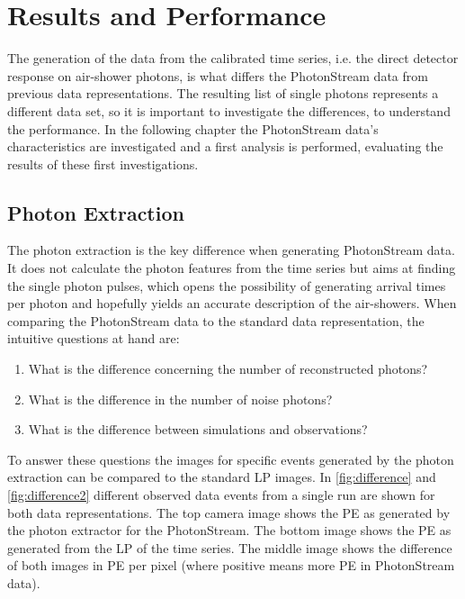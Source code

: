 \chapter{Results and Performance}
\label{ch:results}
%
The generation of the data from the calibrated time series, i.e. the direct
detector response on air-shower photons, is what differs the PhotonStream data
from previous data representations. The resulting list of single photons
represents a different data set, so it is important to investigate the
differences, to understand the performance. In the following chapter the
PhotonStream data's characteristics are investigated and a first analysis is
performed, evaluating the results of these first investigations.

\section{Photon Extraction}
\label{sec:ph_ex}%
%
The photon extraction is the key difference when generating PhotonStream data.
It does not calculate the photon features from the time series but aims at
finding the single photon pulses, which opens the possibility of generating
arrival times per photon and hopefully yields an accurate description of the
air-showers. When comparing the PhotonStream data to the standard data
representation, the intuitive questions at hand are:
%
\begin{enumerate}
  \item What is the difference concerning the number of reconstructed photons?
  \item What is the difference in the number of noise photons?
  \item What is the difference between simulations and observations?
\end{enumerate}
%
To answer these questions the images for specific events generated by the
photon extraction can be compared to the standard LP images. In
\autoref{fig:difference} and \autoref{fig:difference2} different observed data events
from a single run are shown for both data representations. The top camera image
shows the PE as generated by the photon extractor for the PhotonStream. The
bottom image shows the PE as generated from the LP of the time series. The
middle image shows the difference of both images in PE per pixel (where
positive means more PE in PhotonStream data).
%
